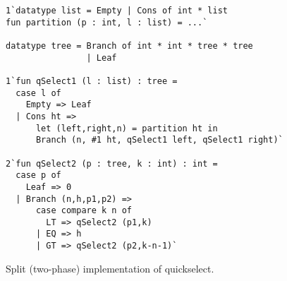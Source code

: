 \begin{figure}
\begin{lstlisting}
1`datatype list = Empty | Cons of int * list
fun partition (p : int, l : list) = ...`
	
datatype tree = Branch of int * int * tree * tree
                | Leaf

1`fun qSelect1 (l : list) : tree =
  case l of
    Empty => Leaf
  | Cons ht => 
      let (left,right,n) = partition ht in
      Branch (n, #1 ht, qSelect1 left, qSelect1 right)`

2`fun qSelect2 (p : tree, k : int) : int = 
  case p of
    Leaf => 0
  | Branch (n,h,p1,p2) => 
      case compare k n of
        LT => qSelect2 (p1,k)
      | EQ => h
      | GT => qSelect2 (p2,k-n-1)`
\end{lstlisting}
\caption{Split (two-phase) implementation of quickselect.}
\label{fig:qs-split}
\end{figure}

